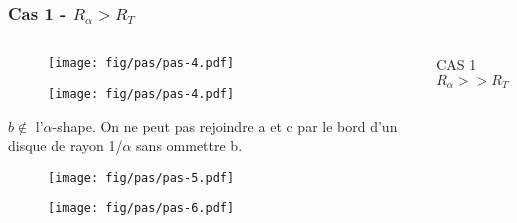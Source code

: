 
\begin{frame}
  \frametitle{Cas 1 - $R_{\alpha} > R_T$}
\begin{columns}[t]
    \begin{column}{7cm}
      {
        \begin{figure}[h!]
          \centering
          \texttt{[image: fig/pas/pas-4.pdf]}
        \end{figure}
      }
      {
        \begin{figure}[h!]
          \centering
          \texttt{[image: fig/pas/pas-4.pdf]}
        \end{figure}
      
        \begin{block}{$b \notin$ l'$\alpha$-shape.}
          On ne peut pas rejoindre a et c par le bord d'un disque de rayon 1/$\alpha$ sans ommettre b.
        \end{block}
      }
      {
        \begin{figure}[h!]
          \centering
          \texttt{[image: fig/pas/pas-5.pdf]}
        \end{figure}
      }
      {
        \begin{figure}[h!]
          \centering
          \texttt{[image: fig/pas/pas-6.pdf]}
        \end{figure}
      }
    \end{column}
    \begin{column}{3cm}
      \begin{block}{}
        {
          \alert{CAS 1}
          \alert{$R_{\alpha} >> R_T$}\\

}
\end{block}
\end{column}
\end{columns}
\end{frame}
